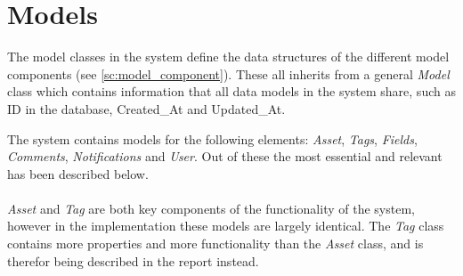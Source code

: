 \section{Models}
The model classes in the system define the data structures of the different model components (see \autoref{sc:model_component}). These all inherits from a general \textit{Model} class which contains information that all data models in the system share, such as ID in the database, Created\_At and Updated\_At. 
\par
The system contains models for the following elements: \textit{Asset}, \textit{Tags}, \textit{Fields}, \textit{Comments}, \textit{Notifications} and \textit{User}. Out of these the most essential and relevant has been described below. 
\\\\
\textit{Asset} and \textit{Tag} are both key components of the functionality of the system, however in the implementation these models are largely identical. The \textit{Tag} class contains more properties and more functionality than the \textit{Asset} class, and is therefor being described in the report instead.


